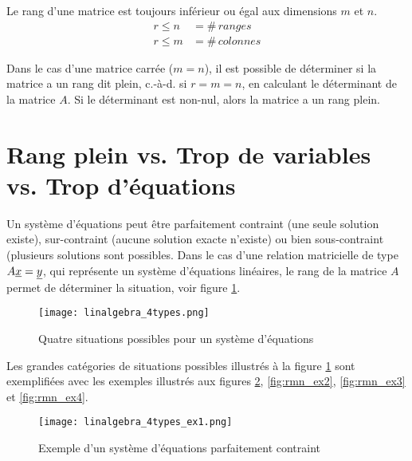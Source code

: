 Le rang d'une matrice est toujours inférieur ou égal aux dimensions $m$ et $n$.
\begin{align}
	r \leq n &= \#\, ranges \\
	r \leq m &= \#\, colonnes
\end{align}

Dans le cas d'une matrice carrée ($m=n$), il est possible de déterminer si la matrice a un rang dit plein, c.-à-d. si $r=m=n$, en calculant le déterminant de la matrice $A$. Si le déterminant est non-nul, alors la matrice a un rang plein.


\newpage
\section{Rang plein vs. Trop de variables vs. Trop d’équations}
\label{sec:rangpleinvstrop}

Un système d'équations peut être parfaitement contraint (une seule solution existe), sur-contraint (aucune solution exacte n'existe) ou bien sous-contraint (plusieurs solutions sont possibles. Dans le cas d'une relation matricielle de type $A \underline{x} = \underline{y} $, qui représente un système d’équations linéaires, le rang de la matrice $A$ permet de déterminer la situation, voir figure \ref{fig:rmn}.

\begin{figure}[htp]
	\centering
	\texttt{[image: linalgebra\_4types.png]}
	\caption{Quatre situations possibles pour un système d'équations}
	\label{fig:rmn}
\end{figure}

Les grandes catégories de situations possibles illustrés à la figure \ref{fig:rmn} sont exemplifiées avec les exemples illustrés aux figures \ref{fig:rmn_ex1}, \ref{fig:rmn_ex2}, \ref{fig:rmn_ex3} et \ref{fig:rmn_ex4}.

\begin{figure}[htp]
	\centering
	\texttt{[image: linalgebra\_4types\_ex1.png]}
	\caption{Exemple d'un système d'équations parfaitement contraint}
	\label{fig:rmn_ex1}
\end{figure}

